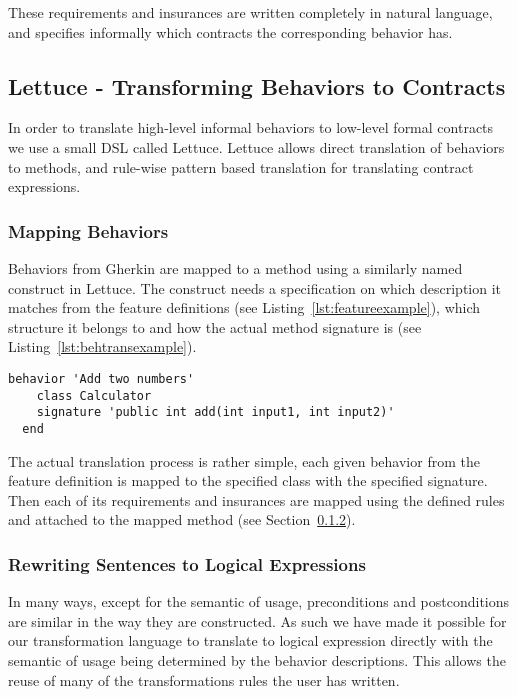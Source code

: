 These requirements and insurances are written completely in
natural language, and specifies informally which contracts the corresponding
behavior has.

\subsection{Lettuce - Transforming Behaviors to Contracts}
\label{sub:Lettuce - Transforming Behaviors to Contracts}

In order to translate high-level informal behaviors to low-level formal
contracts we use a small DSL called Lettuce.
Lettuce allows direct translation of behaviors to methods,
and rule-wise pattern based translation for translating contract expressions.

\subsubsection{Mapping Behaviors}
\label{sub:Mapping Behaviors}

Behaviors from Gherkin are mapped to a method using a similarly named
construct in Lettuce. The construct needs a specification on which
description it matches from the feature definitions (see Listing~\ref{lst:featureexample}),
which structure it belongs to and how the actual method signature is
(see Listing~\ref{lst:behtransexample}).

\begin{lstlisting}[caption={General Behavior Description of Adding Natural Numbers},label={lst:behtransexample}]
  behavior 'Add two numbers'
    class Calculator
    signature 'public int add(int input1, int input2)'
  end
\end{lstlisting}

The actual translation process is rather simple,
each given behavior from the feature definition is mapped to the
specified class with the specified signature. Then each of its requirements
and insurances are mapped using the defined rules and attached to the mapped
method (see Section~\ref{sub:RewritingSentencestoLogicalExpressions}).

\subsubsection{Rewriting Sentences to Logical Expressions}
\label{sub:RewritingSentencestoLogicalExpressions}

In many ways, except for the semantic of usage,
preconditions and postconditions are similar in the way they are constructed.
As such we have made it possible for our transformation language to translate
to logical expression directly with the semantic of usage being determined by
the behavior descriptions. 
This allows the reuse of many of the transformations rules the user has written.


